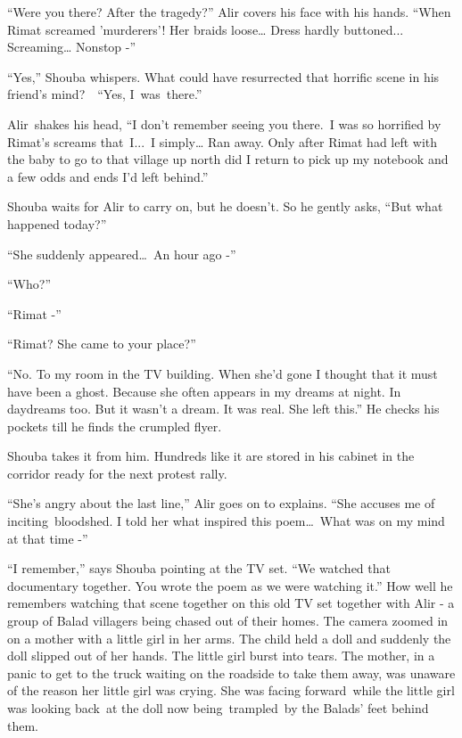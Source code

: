 \documentclass[twoside,11pt]{book}
\begin{document}
``Were you there? After the tragedy?'' Alir covers his face with his hands.
``When Rimat screamed 'murderers'! Her braids loose{\dots} Dress hardly buttoned... Screaming{\dots}
Nonstop -''

``Yes,'' Shouba whispers. What could have resurrected that horrific scene in his friend's
mind?\ \ {}``Yes, I\ was\ there.''

Alir~shakes his head, ``I don't remember seeing you there.{\ }I was so horrified by Rimat's
screams that\ I...\ I simply{\dots} Ran away. Only after Rimat had left with the baby to go to that village up north
did I return to pick up my notebook and a few odds and ends I'd left behind.''

Shouba waits for Alir to carry on, but he doesn't. So he gently asks, ``But what happened
today?'' 

``She suddenly appeared{\dots}\ An hour ago -'' 

``Who?'' 

``Rimat -'' 

``Rimat? She came to your place?'' 

``No. To my room in the TV building. When she'd gone I thought that it must have been a ghost. Because she
often appears in my dreams at night. In daydreams too. But it wasn't a dream. It was real. She left
this.'' He checks his pockets till he finds the crumpled flyer.

Shouba takes it from him. Hundreds like it are stored in his cabinet in the corridor ready for the next protest rally.\ 

``She's angry about the last line,'' Alir goes on to explains. ``She accuses me
of inciting~bloodshed. I told her what inspired this poem{\dots}\ What was on my mind at that time -''

``I remember,'' says Shouba pointing at the TV set. ``We watched that documentary
together. You wrote the poem as we were watching it.'' How well he remembers watching that scene together
on this old TV set together with Alir {}-  a group of Balad villagers being chased out of their homes. The camera
zoomed in on a mother with a little girl in her arms. The child held a doll and suddenly the doll slipped out of her
hands. The little girl burst into tears. The mother, in a panic to get to the truck waiting on the roadside to take
them away, was unaware of the reason her little girl was crying. She was facing forward~while the little girl was
looking back~at the doll now being~trampled~by the Balads' feet behind them.
\end{document}
